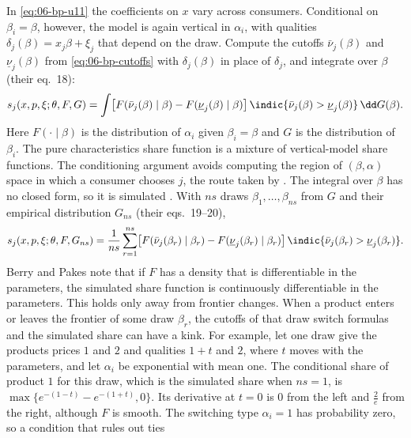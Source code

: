 In \eqref{eq:06-bp-u11} the coefficients on $x$ vary across consumers. Conditional on $\beta_i = \beta$, however, the model
is again vertical in $\alpha_i$, with qualities $\delta_j(\beta) = x_j \beta + \xi_j$ that depend on the draw. Compute the
cutoffs $\bar\nu_j(\beta)$ and $\underline\nu_j(\beta)$ from \eqref{eq:06-bp-cutoffs} with $\delta_j(\beta)$ in place of
$\delta_j$, and integrate over $\beta$ (their eq.~18):
\begin{equation}\label{eq:06-bp-share18}
  s_j(x, p, \xi; \theta, F, G) = \int \bigl[F(\bar\nu_j(\beta) \mid \beta) - F(\underline\nu_j(\beta) \mid \beta)\bigr]\,
  \indic\{\bar\nu_j(\beta) > \underline\nu_j(\beta)\}\, \dd G(\beta) .
\end{equation}
Here $F(\cdot \mid \beta)$ is the distribution of $\alpha_i$ given $\beta_i = \beta$ and $G$ is the distribution of
$\beta_i$. The pure characteristics share function is a mixture of vertical-model share functions. The conditioning
argument avoids computing the region of $(\beta, \alpha)$ space in which a consumer chooses $j$, the route taken by
\citet{FeenstraLevinsohn1995}. The integral over $\beta$ has no closed form, so it is simulated \citep{Pakes1986}. With
$ns$ draws $\beta_1, \dots, \beta_{ns}$ from $G$ and their empirical distribution $G_{ns}$ (their eqs.~19--20),
\begin{equation}\label{eq:06-bp-share20}
  s_j(x, p, \xi; \theta, F, G_{ns}) = \frac{1}{ns} \sum_{r=1}^{ns}
  \bigl[F(\bar\nu_j(\beta_r) \mid \beta_r) - F(\underline\nu_j(\beta_r) \mid \beta_r)\bigr]\,
  \indic\{\bar\nu_j(\beta_r) > \underline\nu_j(\beta_r)\} .
\end{equation}
Berry and Pakes note that if $F$ has a density that is differentiable in the parameters, the simulated share function is
continuously differentiable in the parameters. This holds only away from frontier changes. When a product enters or
leaves the frontier of some draw $\beta_r$, the cutoffs of that draw switch formulas and the simulated share can have a
kink. For example, let one draw give the products prices $1$ and $2$ and qualities $1 + t$ and $2$, where $t$ moves with
the parameters, and let $\alpha_i$ be exponential with mean one. The conditional share of product $1$ for this draw, which is the simulated share when
$ns = 1$, is $\max\{e^{-(1 - t)} - e^{-(1 + t)}, 0\}$. Its derivative at $t = 0$ is $0$ from the left and $\frac{2}{e}$ from the right,
although $F$ is smooth. The switching type $\alpha_i = 1$ has probability zero, so a condition that rules out ties
